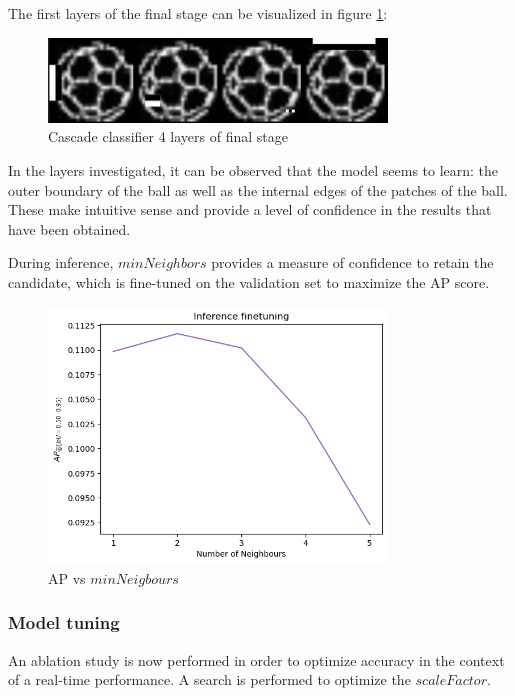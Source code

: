 \documentclass[a4paper,twoside,12pt]{report}
\begin{document}
The first layers of the final stage can be visualized in figure \ref{fig:vjstages}:

\begin{figure}[h!]
\begin{center}
\includegraphics[width=9cm]{images/vj_result.jpg}
\caption{Cascade classifier 4 layers of final stage}
\label{fig:vjstages}
\end{center}
\end{figure}

In the layers investigated, it can be observed that the model seems to learn: the outer boundary of the ball as well as the internal edges of the patches of the ball. These make intuitive sense and provide a level of confidence in the results that have been obtained.

During inference, $minNeighbors$ provides a measure of confidence to retain the candidate, which is fine-tuned on the validation set to maximize the AP score.

\begin{figure}[h!]
\begin{center}
\includegraphics[width=9cm]{images/vj_tune.png}
\caption{AP vs $minNeigbours$}
\label{fig:vjneighbors}
\end{center}
\end{figure}

\subsubsection{Model tuning}

An ablation study is now performed in order to optimize accuracy in the context of a real-time performance. A search is performed to optimize the $scaleFactor$.
\end{document}

